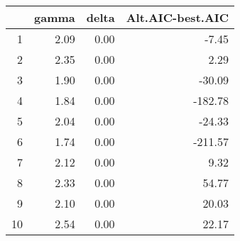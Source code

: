 \begin{table}[ht]
\centering
\begin{tabular}{rrrr}
  \hline
 & gamma & delta & Alt.AIC-best.AIC \\ 
  \hline
1 & 2.09 & 0.00 & -7.45 \\ 
  2 & 2.35 & 0.00 & 2.29 \\ 
  3 & 1.90 & 0.00 & -30.09 \\ 
  4 & 1.84 & 0.00 & -182.78 \\ 
  5 & 2.04 & 0.00 & -24.33 \\ 
  6 & 1.74 & 0.00 & -211.57 \\ 
  7 & 2.12 & 0.00 & 9.32 \\ 
  8 & 2.33 & 0.00 & 54.77 \\ 
  9 & 2.10 & 0.00 & 20.03 \\ 
  10 & 2.54 & 0.00 & 22.17 \\ 
   \hline
\end{tabular}
\end{table}
